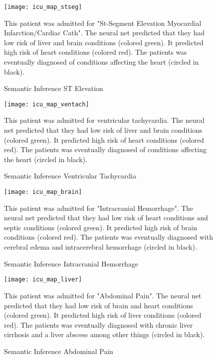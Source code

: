 {    \begin{figure}
    \texttt{[image: icu\_map\_stseg]}
    \caption{Semantic Inference ST Elevation}
    \vspace{12px}
    This patient was admitted for "St-Segment Elevation Myocardial Infarction/Cardiac Cath".  The neural net predicted that they had low risk of liver and brain conditions (colored green).  It predicted high risk of heart conditions (colored red).  The patients was eventually diagnosed of conditions affecting the heart (circled in black).
    \label{fig:icu_map_stseg}
    \end{figure}
    
    \begin{figure}
    \texttt{[image: icu\_map\_ventach]}
    \caption{Semantic Inference Ventricular Tachycardia}
    \vspace{12px}
    This patient was admitted for ventricular tachycardia.  The neural net predicted that they had low risk of liver and brain conditions (colored green).  It predicted high risk of heart conditions (colored red).  The patients was eventually diagnosed of conditions affecting the heart (circled in black).
    \label{fig:icu_map_ventach}
    \end{figure}
    
    \begin{figure}
    \texttt{[image: icu\_map\_brain]}
    \caption{Semantic Inference Intracranial Hemorrhage}
    \vspace{12px}
    This patient was admitted for "Intracranial Hemorrhage".  The neural net predicted that they had low risk of heart conditions and septic conditions (colored green).  It predicted high risk of brain conditions (colored red).  The patients was eventually diagnosed with cerebral edema and intracerebral hemorrhage (circled in black).
    \label{fig:icu_map_brain}
    \end{figure}
    
    \begin{figure}
    \texttt{[image: icu\_map\_liver]}
    \caption{Semantic Inference Abdominal Pain}
    \vspace{12px}
    This patient was admitted for "Abdominal Pain".  The neural net predicted that they had low risk of brain and heart conditions (colored green).  It predicted high risk of liver conditions (colored red).  The patients was eventually diagnosed with chronic liver cirrhosis and a liver abscess among other things (circled in black).
    \label{fig:icu_map_liver}
    \end{figure}
}